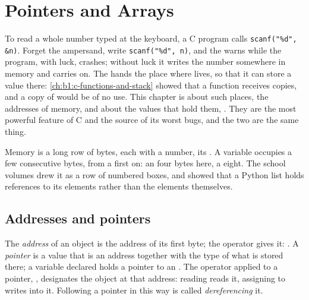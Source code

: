 \chapter{Pointers and Arrays}\label{ch:b1:pointers-and-arrays}

To read a whole number typed at the keyboard, a C program calls \texttt{scanf("\%d", \&n)}. Forget the ampersand, write
\texttt{scanf("\%d", n)}, and the  warns while the program, with luck, crashes; without luck it writes the
number somewhere in memory and carries on. The \code{&} hands  the place where  lives, so that
it can store a value there: \cref{ch:b1:c-functions-and-stack} showed that a function receives copies, and a copy of
 would be of no use. This chapter is about such places, the addresses of memory, and about the values that
hold them, . They are the most powerful feature of C and the source of its worst bugs, and the two are the
same thing.

\begin{recall}
Memory is a long row of bytes, each with a number, its . A variable occupies a few consecutive bytes, from a
first  on: an  four bytes here, a  eight. The school volumes drew it as a row of
numbered boxes, and showed that a Python list holds references to its elements rather than the elements
themselves.
\end{recall}

\section{Addresses and pointers}\label{sec:b1:pointers-and-arrays:pointers}

\begin{definition}\label{def:b1:pointers-and-arrays:pointer}
The \emph{address} of an object is the address of its first byte; the operator
\code{&} gives it: . A \emph{pointer} is a value that is an address together with the type
of what is stored there; a variable declared  holds a pointer to an . The operator \code{*}
applied to a pointer, , designates the object at that address: reading  reads it, assigning to
 writes into it. Following a pointer in this way is called \emph{dereferencing} it.
\end{definition}

